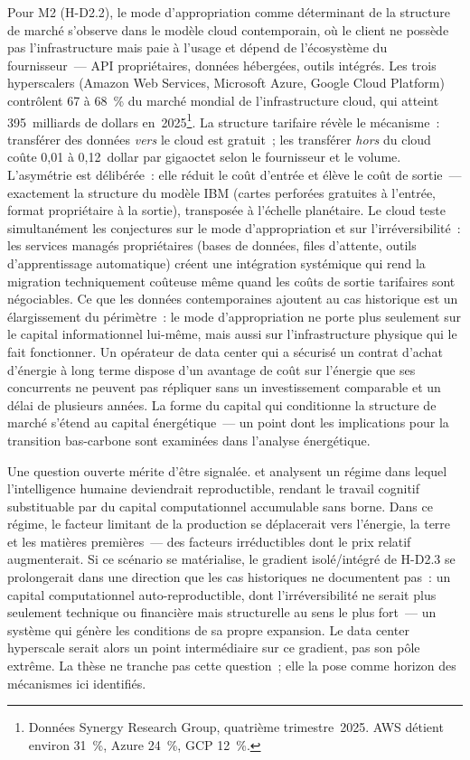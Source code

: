 Pour M2 (H-D2.2), le mode d'appropriation comme déterminant de la structure de marché s'observe dans le modèle cloud contemporain, où le client ne possède pas l'infrastructure mais paie à l'usage et dépend de l'écosystème du fournisseur~--- API propriétaires, données hébergées, outils intégrés. Les trois hyperscalers (Amazon Web Services, Microsoft Azure, Google Cloud Platform) contrôlent 67 à 68~\% du marché mondial de l'infrastructure cloud, qui atteint 395~milliards de dollars en~2025\footnote{Données Synergy Research Group, quatrième trimestre~2025. AWS détient environ 31~\%, Azure 24~\%, GCP 12~\%.}. La structure tarifaire révèle le mécanisme~: transférer des données \emph{vers} le cloud est gratuit~; les transférer \emph{hors} du cloud coûte 0,01 à 0,12~dollar par gigaoctet selon le fournisseur et le volume. L'asymétrie est délibérée~: elle réduit le coût d'entrée et élève le coût de sortie~--- exactement la structure du modèle IBM (cartes perforées gratuites à l'entrée, format propriétaire à la sortie), transposée à l'échelle planétaire. Le cloud teste simultanément les conjectures sur le mode d'appropriation et sur l'irréversibilité~: les services managés propriétaires (bases de données, files d'attente, outils d'apprentissage automatique) créent une intégration systémique qui rend la migration techniquement coûteuse même quand les coûts de sortie tarifaires sont négociables. Ce que les données contemporaines ajoutent au cas historique est un élargissement du périmètre~: le mode d'appropriation ne porte plus seulement sur le capital informationnel lui-même, mais aussi sur l'infrastructure physique qui le fait fonctionner. Un opérateur de data center qui a sécurisé un contrat d'achat d'énergie à long terme dispose d'un avantage de coût sur l'énergie que ses concurrents ne peuvent pas répliquer sans un investissement comparable et un délai de plusieurs années. La forme du capital qui conditionne la structure de marché s'étend au capital énergétique~--- un point dont les implications pour la transition bas-carbone sont examinées dans l'analyse énergétique.

Une question ouverte mérite d'être signalée. \textcite{korinek_economic_policy_2024} et \textcite{trammell_korinek_2023} analysent un régime dans lequel l'intelligence humaine deviendrait reproductible, rendant le travail cognitif substituable par du capital computationnel accumulable sans borne. Dans ce régime, le facteur limitant de la production se déplacerait vers l'énergie, la terre et les matières premières~--- des facteurs irréductibles dont le prix relatif augmenterait. Si ce scénario se matérialise, le gradient isolé/intégré de H-D2.3 se prolongerait dans une direction que les cas historiques ne documentent pas~: un capital computationnel auto-reproductible, dont l'irréversibilité ne serait plus seulement technique ou financière mais structurelle au sens le plus fort~--- un système qui génère les conditions de sa propre expansion. Le data center hyperscale serait alors un point intermédiaire sur ce gradient, pas son pôle extrême. La thèse ne tranche pas cette question~; elle la pose comme horizon des mécanismes ici identifiés.

